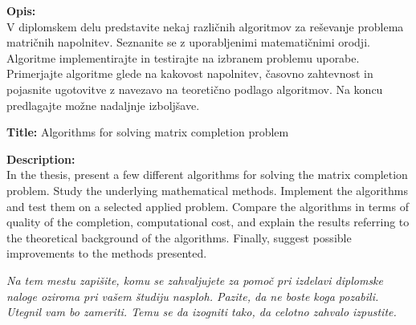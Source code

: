 \documentclass[a4paper,12pt,openright]{book}
\newcommand{\clearemptydoublepage}{\newpage{\pagestyle{empty}\cleardoublepage}}
\begin{document}
\bigskip
\noindent\textbf{Opis:}\\
V diplomskem delu 
predstavite nekaj različnih algoritmov za reševanje problema matričnih napolnitev. Seznanite se z uporabljenimi matematičnimi orodji. Algoritme implementirajte in testirajte na izbranem problemu uporabe.
Primerjajte algoritme glede na kakovost napolnitev, časovno zahtevnost in pojasnite ugotovitve z navezavo na teoretično podlago algoritmov. Na koncu predlagajte možne nadaljnje izboljšave.

\bigskip
\noindent\textbf{Title:} Algorithms for solving matrix completion problem

\bigskip
\noindent\textbf{Description:}\\
In the thesis, 
present a few different algorithms for solving the matrix completion problem.
Study the underlying mathematical methods. Implement the algorithms and test them on a selected applied problem. Compare the algorithms in terms of quality of the completion, computational cost, and explain the results referring to the theoretical background of the algorithms. Finally, suggest possible improvements to the methods presented.
\vfill



\vspace{2cm}

\clearemptydoublepage

\thispagestyle{empty}\mbox{}\vfill\null\it%
\noindent
Na tem mestu zapišite, komu se zahvaljujete za pomoč pri izdelavi diplomske naloge oziroma pri vašem študiju nasploh. Pazite, da ne boste koga pozabili. Utegnil vam bo zameriti. Temu se da izogniti tako, da celotno zahvalo izpustite.
\rm\normalfont

\clearemptydoublepage


\clearemptydoublepage


\pagestyle{empty}
\def\thepage{}%
\tableofcontents{}


\clearemptydoublepage

\end{document}
